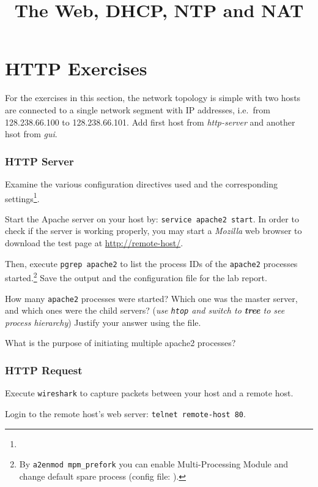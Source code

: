 \documentclass{../UTNetLab}
\title{The Web, DHCP, NTP and NAT}
\begin{document}
\part{HTTP Exercises}
    For the exercises in this section, the network topology is simple with two hosts are connected to a single network segment with IP addresses, i.e.\  from 128.238.66.100 to 128.238.66.101. Add first host from \textit{http-server} and another hsot from \textit{gui}.

\section{HTTP Server}
    Examine the various configuration directives used and the corresponding settings\footnote{}. 

    Start the Apache server on your host by: \lstinline{service apache2 start}.
    In order to check if the server is working properly, you may start a \textit{Mozilla} web browser to download the test page at \url{http://remote-host/}.

    Then, execute \lstinline{pgrep apache2} to list the process IDs of the \lstinline{apache2} processes started.\footnote{By \lstinline{a2enmod mpm_prefork} you can enable Multi-Processing Module and change default spare process (config file: ).}
    Save the output and the configuration file for the lab report.
    
    \begin{report}
    \item How many \lstinline{apache2} processes were started?
    Which one was the master server, and which ones were the child servers? (\textit{use \lstinline{htop} and switch to \textbf{tree} to see process hierarchy})
    Justify your answer using the  file.
    
    \item What is the purpose of initiating multiple apache2 processes?
    \end{report}

\section{HTTP Request}
    Execute \lstinline{wireshark} to capture packets between your host and a remote host. 

    Login to the remote host’s web server: \lstinline[emph={your-host, remote-host}]{telnet remote-host 80}. 
\end{document}
